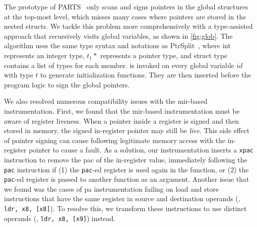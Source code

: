 The prototype of PARTS~\cite{pac-it-up} only scans and signs pointers in the global structures at the top-most level, which misses many cases where pointers are stored in the nested structs.
We tackle this problem more comprehensively with a type-assisted approach that recursively visits global variables, as shown in \autoref{fig:glob}.
The algorithm uses the same type syntax and notations as PtrSplit~\cite{ptrsplit}, where int represents an integer type, $t_1*$ represents a pointer type, and struct type contains a list of types for each member. 
 is invoked on every global variable $id$ with type $t$ to generate initialization functions. They are then inserted before the program logic to sign the global pointers.

We also resolved numerous compatibility issues with the \gls{mir}-based instrumentation.
First, we found that the \gls{mir}-based instrumentation must be aware of register liveness.
When a pointer inside a register is signed and then stored in memory, the signed in-register pointer may still be \emph{live}.
This side effect of pointer signing can cause following legitimate memory access with the in-register pointer to cause a fault.
As a solution, our instrumentation inserts a \texttt{xpac} instruction to remove the \gls{pac} of the in-register value, immediately following the \texttt{pac} instruction if (1) the \texttt{pac}-ed register is used again in the function, or (2) the \texttt{pac}-ed register is passed to another function as an argument.
Another issue that we found was the cases of \gls{pa} instrumentation failing on load and store instructions that have the same register in source and destination operands (\eg, \texttt{ldr, x8, [x8]}).
To resolve this, we transform these instructions to use distinct operands (\eg, \texttt{ldr, x8, [x9]}) instead.





